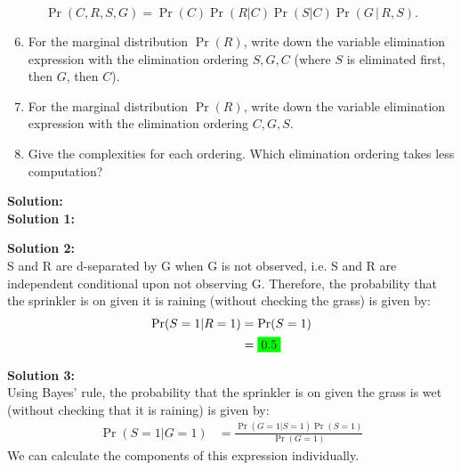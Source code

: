 \documentclass[submit]{harvardml}
\newcommand{\attr}[1]{\textsf{#1}}
\newcommand{\mathcolorbox}[2]{\colorbox{#1}{$\displaystyle #2$}}
\begin{document}
\begin{problem}
$$
\Pr(C, R,S,G) = \Pr(C)\Pr(R|C)\Pr(S|C)\Pr(G\, |\, R, S).
$$

\begin{enumerate}
    \setcounter{enumi}{5}
    \item For the marginal distribution $\Pr(R)$, write down the variable elimination expression with the elimination ordering $S, G, C$ (where $S$ is eliminated first, then $G$, then $C$).
    \item For the marginal distribution $\Pr(R)$, write down the variable elimination expression with the elimination ordering $C,G,S$.
    \item Give the complexities for each ordering. Which elimination ordering takes less computation?
\end{enumerate}
\end{problem}
\newpage

\textbf{Solution:}\\
\textbf{Solution 1:}
\begin{center}
\end{center}

\textbf{Solution 2:}\\
S and R are d-separated by G when G is not observed, i.e. S and R are independent conditional upon not observing G. Therefore, the probability that the sprinkler is on given it is raining (without checking the grass) is given by:
\begin{align*}
     \Pr(S = 1 | R = 1) &= \Pr(S = 1)\\
     &= \mathcolorbox{green}{0.5}
\end{align*}

\textbf{Solution 3:}\\
Using Bayes' rule, the probability that the sprinkler is on given the grass is wet (without checking that it is raining) is given by:
\begin{align*}
     \Pr(S = 1 | G = 1) &= \frac{\Pr(G = 1 | S = 1) \Pr(S=1)}{\Pr(G=1)}
\end{align*}
We can calculate the components of this expression individually.\\
\end{document}
